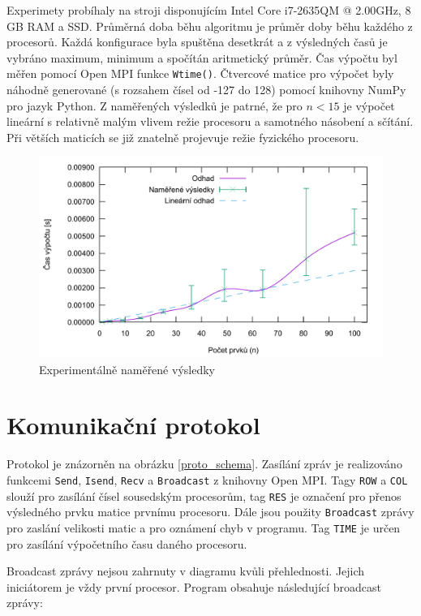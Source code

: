 \documentclass[11pt,a4paper]{article}
\begin{document}
Experimety probíhaly na stroji disponujícím Intel Core i7-2635QM @ 2.00GHz, 8 GB RAM a SSD. Průměrná doba běhu algoritmu je průměr doby běhu každého z procesorů. Každá konfigurace byla spuštěna desetkrát a z výsledných časů je vybráno maximum, minimum a spočítán aritmetický průměr. Čas výpočtu byl měřen pomocí Open MPI funkce \texttt{Wtime()}. Čtvercové matice pro výpočet byly náhodně generované (s rozsahem čísel od -127 do 128) pomocí knihovny NumPy pro jazyk Python. Z naměřených výsledků je patrné, že pro $n < 15$ je výpočet lineární s relativně malým vlivem režie procesoru a samotného násobení a sčítání. Při větších maticích se již znatelně projevuje režie fyzického procesoru.

\begin{figure}[!ht]
    \centering
		\includegraphics[width=1\textwidth]{results}
    \caption{Experimentálně naměřené výsledky}
\end{figure}

\section{Komunikační protokol}
\label{proto}

Protokol je znázorněn na obrázku \ref{proto_schema}. Zasílání zpráv je realizováno funkcemi \texttt{Send}, \texttt{Isend}, \texttt{Recv} a \texttt{Broadcast} z knihovny Open MPI. Tagy \texttt{ROW} a \texttt{COL} slouží pro zasílání čísel sousedským procesorům, tag \texttt{RES} je označení pro přenos výsledného prvku matice prvnímu procesoru. Dále jsou použity \texttt{Broadcast} zprávy pro zaslání velikosti matic a pro oznámení chyb v programu. Tag \texttt{TIME} je určen pro zasílání výpočetního času daného procesoru.

Broadcast zprávy nejsou zahrnuty v diagramu kvůli přehlednosti. Jejich iniciátorem je vždy první procesor. Program obsahuje následující broadcast zprávy:
\end{document}
